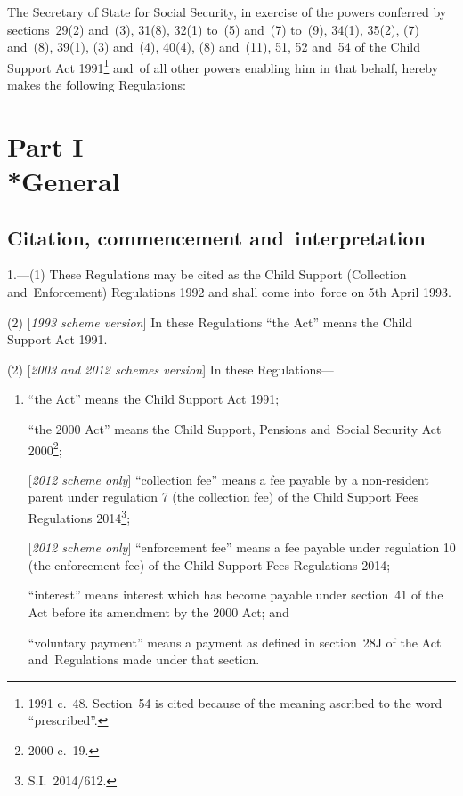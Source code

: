 \documentclass[12pt,a4paper]{article}
\title{\regstitle}
\author{S.I.~1992 No.~1989}
\date{Made 17th August 1992\\Laid before Parliament 26th August 1992\\Coming into~force 5th April 1993}
\begin{document}
\maketitle

\noindent
The Secretary of State for Social Security, in exercise of the powers conferred by sections~29(2) and~(3), 31(8), 32(1) to~(5) and~(7) to~(9), 34(1), 35(2), (7) and~(8), 39(1), (3) and~(4), 40(4), (8) and~(11), 51, 52 and~54 of the Child Support Act 1991\footnote{1991 c.~48. Section~54 is cited because of the meaning ascribed to the word “prescribed”.} and~of all other powers enabling him in that behalf, hereby makes the following Regulations:

{\sloppy

\tableofcontents

}

\setcounter{secnumdepth}{-2}

\section[Part I --- General]{Part I\\*General}

\subsection[1. Citation, commencement and~interpretation]{Citation, commencement and~interpretation}

\renewcommand\parthead{--- Part I}

1.—(1) These Regulations may be cited as the Child Support (Collection and~Enforcement) Regulations 1992 and shall come into~force on 5th April 1993.

(2) [\emph{1993 scheme version}] In these Regulations “the Act” means the Child Support Act 1991.

(2) [\emph{2003 and 2012 schemes version}] In these Regulations—
\begin{enumerate}\item[]
“the Act” means the Child Support Act 1991;

“the 2000 Act” means the Child Support, Pensions and~Social Security Act 2000\footnote{2000 c.~19.};

[\emph{2012 scheme only}] “collection fee” means a fee payable by a non-resident parent under regulation 7 (the collection fee) of the Child Support Fees Regulations 2014\footnote{S.I.~2014/612.};

[\emph{2012 scheme only}] “enforcement fee” means a fee payable under regulation 10 (the enforcement fee) of the Child Support Fees Regulations 2014;

“interest” means interest which has become payable under section~41 of the Act before its amendment by the 2000 Act; and

“voluntary payment” means a payment as defined in section~28J of the Act and~Regulations made under that section.
\end{enumerate}
\end{document}
